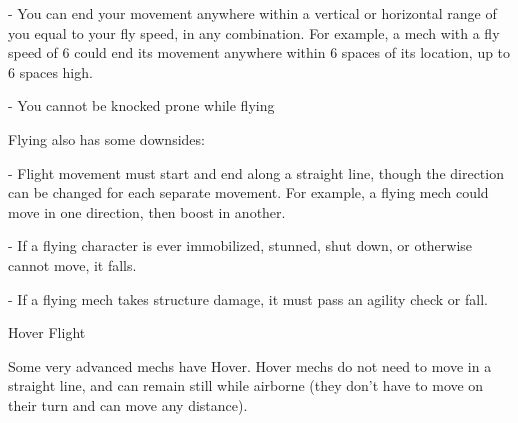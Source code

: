     -    You can end your movement anywhere within a vertical or horizontal range of you equal
         to your fly speed, in any combination. For example, a mech with a fly speed of 6 could
         end its movement anywhere within 6 spaces of its location, up to 6 spaces high.

    -    You cannot be knocked prone while flying


Flying also has some downsides:

             -    Flight movement must start and end along a straight line, though the direction
                 can be changed for each separate movement. For example, a flying mech could
                  move in one direction, then boost in another.

             -    If a flying character is ever immobilized, stunned, shut down, or otherwise cannot
                  move, it falls.

             -    If a flying mech takes structure damage, it must pass an agility check or fall.


                                                  Hover Flight

Some very advanced mechs have Hover. Hover mechs do not need to move in a straight line,
and can remain still while airborne (they don’t have to move on their turn and can move any
distance).